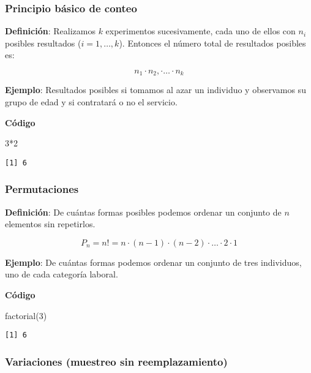 \documentclass[
]{article}
\newenvironment{Shaded}{\begin{snugshade}}{\end{snugshade}}
\newcommand{\DecValTok}[1]{\textcolor[rgb]{0.00,0.00,0.81}{#1}}
\newcommand{\FunctionTok}[1]{\textcolor[rgb]{0.00,0.00,0.00}{#1}}
\newcommand{\NormalTok}[1]{#1}
\newcommand{\SpecialCharTok}[1]{\textcolor[rgb]{0.00,0.00,0.00}{#1}}
\begin{document}
\hypertarget{principio-buxe1sico-de-conteo}{%
\subsubsection{Principio básico de
conteo}\label{principio-buxe1sico-de-conteo}}

\textbf{Definición}: Realizamos \(k\) experimentos sucesivamente, cada
uno de ellos con \(n_i\) posibles resultados (\(i=1, \ldots, k\)).
Entonces el número total de resultados posibles es:

\[n_1\cdot n_2, \cdot \ldots \cdot n_k\]

\textbf{Ejemplo}: Resultados posibles si tomamos al azar un individuo y
observamos su grupo de edad y si contratará o no el servicio.

\textbf{Código}

\begin{Shaded}
\begin{Highlighting}[]
\DecValTok{3}\SpecialCharTok{*}\DecValTok{2}
\end{Highlighting}
\end{Shaded}

\begin{verbatim}
[1] 6
\end{verbatim}

\hypertarget{permutaciones}{%
\subsubsection{Permutaciones}\label{permutaciones}}

\textbf{Definición}: De cuántas formas posibles podemos ordenar un
conjunto de \(n\) elementos sin repetirlos.

\[P_n = n! = n\cdot(n-1)\cdot(n-2)\cdot\ldots\cdot 2\cdot 1\]

\textbf{Ejemplo}: De cuántas formas podemos ordenar un conjunto de tres
individuos, uno de cada categoría laboral.

\textbf{Código}

\begin{Shaded}
\begin{Highlighting}[]
\FunctionTok{factorial}\NormalTok{(}\DecValTok{3}\NormalTok{)}
\end{Highlighting}
\end{Shaded}

\begin{verbatim}
[1] 6
\end{verbatim}

\hypertarget{variaciones-muestreo-sin-reemplazamiento}{%
\subsubsection{Variaciones (muestreo sin
reemplazamiento)}\label{variaciones-muestreo-sin-reemplazamiento}}
\end{document}
